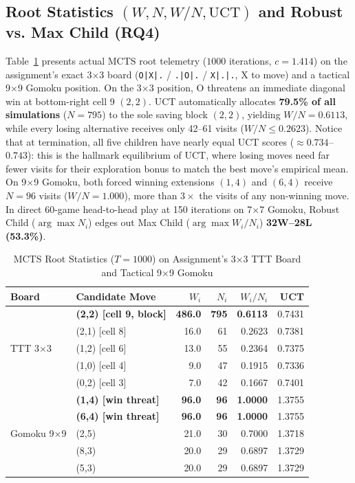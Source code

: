 \documentclass[conference]{IEEEtran}
\begin{document}
\subsection{Root Statistics $(W, N, W/N, \text{UCT})$ and Robust vs. Max Child (RQ4)}
Table~\ref{tab:root_stats} presents actual MCTS root telemetry ($1000$ iterations, $c=1.414$) on the assignment's exact 3$\times$3 board (\texttt{O|X|.} / \texttt{.|O|.} / \texttt{X|.|.}, X to move) and a tactical 9$\times$9 Gomoku position. On the 3$\times$3 position, O threatens an immediate diagonal win at bottom-right cell 9 $(2,2)$. UCT automatically allocates \textbf{79.5\% of all simulations} ($N=795$) to the sole saving block $(2,2)$, yielding $W/N = 0.6113$, while every losing alternative receives only 42--61 visits ($W/N \le 0.2623$). Notice that at termination, all five children have nearly equal UCT scores ($\approx 0.734$--$0.743$): this is the hallmark equilibrium of UCT, where losing moves need far fewer visits for their exploration bonus to match the best move's empirical mean. On 9$\times$9 Gomoku, both forced winning extensions $(1,4)$ and $(6,4)$ receive $N=96$ visits ($W/N=1.000$), more than $3\times$ the visits of any non-winning move. In direct 60-game head-to-head play at 150 iterations on 7$\times$7 Gomoku, Robust Child ($\arg\max N_i$) edges out Max Child ($\arg\max W_i/N_i$) \textbf{32W--28L (53.3\%)}.

\begin{table}[t]
\centering
\caption{MCTS Root Statistics ($T=1000$) on Assignment's 3$\times$3 TTT Board and Tactical 9$\times$9 Gomoku}
\label{tab:root_stats}
\begin{tabular}{@{}llrrrr@{}}
\toprule
\textbf{Board} & \textbf{Candidate Move} & $W_i$ & $N_i$ & $W_i/N_i$ & \textbf{UCT} \\
\midrule
\multirow{5}{*}{TTT 3$\times$3}
& \textbf{(2,2) [cell 9, block]} & \textbf{486.0} & \textbf{795} & \textbf{0.6113} & 0.7431 \\
& (2,1) [cell 8] & 16.0 & 61 & 0.2623 & 0.7381 \\
& (1,2) [cell 6] & 13.0 & 55 & 0.2364 & 0.7375 \\
& (1,0) [cell 4] & 9.0 & 47 & 0.1915 & 0.7336 \\
& (0,2) [cell 3] & 7.0 & 42 & 0.1667 & 0.7401 \\
\midrule
\multirow{5}{*}{Gomoku 9$\times$9}
& \textbf{(1,4) [win threat]} & \textbf{96.0} & \textbf{96} & \textbf{1.0000} & 1.3755 \\
& \textbf{(6,4) [win threat]} & \textbf{96.0} & \textbf{96} & \textbf{1.0000} & 1.3755 \\
& (2,5) & 21.0 & 30 & 0.7000 & 1.3718 \\
& (8,3) & 20.0 & 29 & 0.6897 & 1.3729 \\
& (5,3) & 20.0 & 29 & 0.6897 & 1.3729 \\
\bottomrule
\end{tabular}
\end{table}
\end{document}
